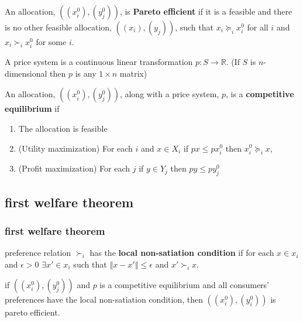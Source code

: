 \documentclass[compress]{beamer}
\def\R{\mathbb{R}}
\newcommand{\norm}[1]{\left\Vert {#1} \right\Vert}
\newcommand{\prefeq}{\succeq}
\newcommand{\pref}{\succ}
\begin{document}
\begin{frame}
  \begin{definition}
    An allocation, $((x_i^0),(y_j^0))$, is \textbf{Pareto efficient}
    if it is a feasible and there is no other feasible allocation,
    $((x_i),(y_j))$, such that $x_i \prefeq_i x_i^0$ for all $i$ and
    $x_i \pref_i x_i^0$ for some $i$.
  \end{definition}

  \begin{definition}
    A price system is a continuous linear transformation $p:S
    \rightarrow \R$. (If $S$ is $n$-dimensional then $p$ is any $1
    \times n$ matrix)
  \end{definition}
\end{frame}

\begin{frame}
  \begin{definition}
    An allocation, $((x_i^0),(y_j^0))$, along with a price system, $p$,
    is a \textbf{competitive equilibrium} if 
    \renewcommand{\theenumi}{C\arabic{enumi}}
    \begin{enumerate}
    \item\label{c1} The allocation is feasible
    \item\label{c2} (Utility maximization) For each $i$ and $x \in X_i$
      if $px \leq px_i^0$ 
      then $x_i^0 \prefeq_i x$, 
    \item\label{c3} (Profit maximization) For each $j$ if $y \in Y_j$
      then $p y \leq p y_j^0$ 
    \end{enumerate}
    \renewcommand{\theenumi}{\roman{enumi}}
  \end{definition}
\end{frame}

\subsection{first welfare theorem}

\begin{frame}
  \frametitle{first welfare theorem}
  \begin{definition}
    preference relation $\pref_i$ has the \textbf{local non-satiation
      condition} if for each $x \in x_i$ and $\epsilon > 0$ $\exists x'
    \in x_i$ such that $\norm{x - x'} \leq \epsilon $ and $x' \pref_i x$.
  \end{definition}
  
  \begin{theorem}
    if $((x_i^0),(y^0_j))$ and $p$ is a competitive equilibrium and all
    consumers' preferences have the local non-satiation condition, then
    $((x_i^0),(y_i^0))$ is pareto efficient.
  \end{theorem}
\end{frame}  
\end{document}
